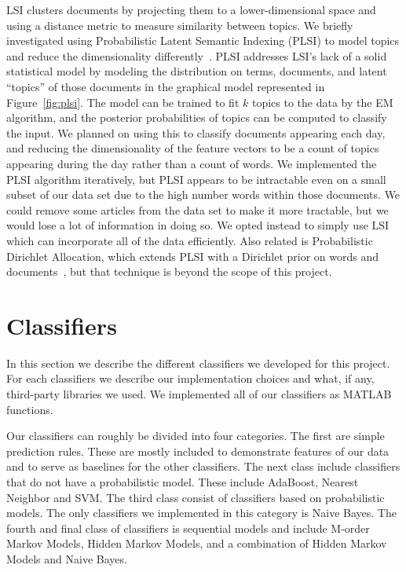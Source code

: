 \documentclass[10pt, twocolumn]{article}
\begin{document}
LSI clusters documents by projecting them to a lower-dimensional space and using a distance metric to measure similarity between topics. We briefly investigated using Probabilistic Latent Semantic Indexing (PLSI) to model topics and reduce the dimensionality differently~\cite{plsi}. PLSI addresses LSI's lack of a solid statistical model by modeling the distribution on terms, documents, and latent ``topics'' of those documents in the graphical model represented in Figure~\ref{fig:plsi}. The model can be trained to fit $k$ topics to the data by the EM algorithm, and the posterior probabilities of topics can be computed to classify the input. We planned on using this to classify documents appearing each day, and reducing the dimensionality of the feature vectors to be a count of topics appearing during the day rather than a count of words. We implemented the PLSI algorithm iteratively, but PLSI appears to be intractable even on a small subset of our data set due to the high number words within those documents. We could remove some articles from the data set to make it more tractable, but we would lose a lot of information in doing so. We opted instead to simply use LSI which can incorporate all of the data efficiently. Also related is Probabilistic Dirichlet Allocation, which extends PLSI with a Dirichlet prior on words and documents~\cite{lda}, but that technique is beyond the scope of this project.

\section{Classifiers}
\label{sec:techniques}

In this section we describe the different classifiers we developed for this project.
For each classifiers we describe our implementation choices and what, if any, third-party libraries we used.
We implemented all of our classifiers as MATLAB functions.

Our classifiers can roughly be divided into four categories. The first are simple prediction rules. These are mostly included to demonstrate features of our data and to serve as baselines for the other classifiers. The next class include classifiers that do not have a probabilistic model. These include AdaBoost, Nearest Neighbor and SVM. The third class consist of classifiers based on probabilistic models. The only classifiers we implemented in this category is Naive Bayes. The fourth and final class of classifiers is sequential models and include M-order Markov Models, Hidden Markov Models, and a combination of Hidden Markov Models and Naive Bayes.
\end{document}
